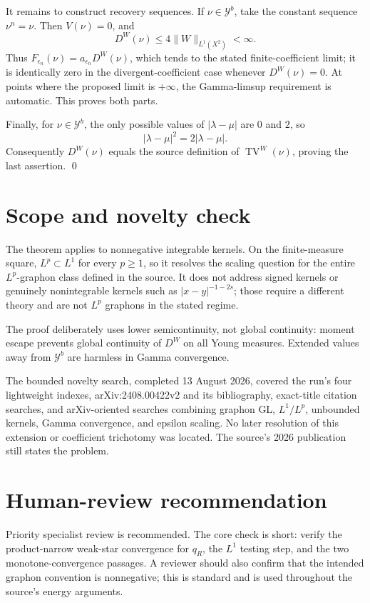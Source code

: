 \documentclass[11pt]{article}
\newcommand{\Y}{\mathcal{Y}}
\newcommand{\TV}{\operatorname{TV}}
\begin{document}
It remains to construct recovery sequences. If \(\nu\in\Y^b\), take the constant sequence \(\nu^n=\nu\). Then \(V(\nu)=0\), and
\[
D^W(\nu)\leq4\lVert W\rVert_{L^1(X^2)}<\infty.
\]
Thus \(F_{\epsilon_n}(\nu)=a_{\epsilon_n}D^W(\nu)\), which tends to the stated finite-coefficient limit; it is identically zero in the divergent-coefficient case whenever \(D^W(\nu)=0\). At points where the proposed limit is \(+\infty\), the Gamma-limsup requirement is automatic. This proves both parts.

Finally, for \(\nu\in\Y^b\), the only possible values of \(|\lambda-\mu|\) are \(0\) and \(2\), so
\[
|\lambda-\mu|^2=2|\lambda-\mu|.
\]
Consequently \(D^W(\nu)\) equals the source definition of \(\TV^W(\nu)\), proving the last assertion. \qed

\section{Scope and novelty check}

The theorem applies to nonnegative integrable kernels. On the finite-measure square, \(L^p\subset L^1\) for every \(p\geq1\), so it resolves the scaling question for the entire \(L^p\)-graphon class defined in the source. It does not address signed kernels or genuinely nonintegrable kernels such as \(|x-y|^{-1-2s}\); those require a different theory and are not \(L^p\) graphons in the stated regime.

The proof deliberately uses lower semicontinuity, not global continuity: moment escape prevents global continuity of \(D^W\) on all Young measures. Extended values away from \(\Y^b\) are harmless in Gamma convergence.

The bounded novelty search, completed 13 August 2026, covered the run's four lightweight indexes, arXiv:2408.00422v2 and its bibliography, exact-title citation searches, and arXiv-oriented searches combining graphon GL, \(L^1/L^p\), unbounded kernels, Gamma convergence, and epsilon scaling. No later resolution of this extension or coefficient trichotomy was located. The source's 2026 publication still states the problem.

\section{Human-review recommendation}

Priority specialist review is recommended. The core check is short: verify the product-narrow weak-star convergence for \(q_R\), the \(L^1\) testing step, and the two monotone-convergence passages. A reviewer should also confirm that the intended graphon convention is nonnegative; this is standard and is used throughout the source's energy arguments.
\end{document}
